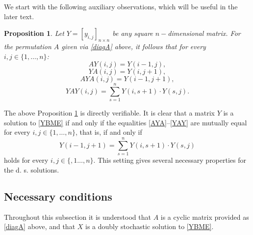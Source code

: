 \documentclass{article}
\newtheorem{proposition}{Proposition}[section]
\theoremstyle{definition}\newtheorem{example}{Example}[section]
\begin{document}
	We start with the following auxiliary observations, which will be useful in the later text. 
	
	
	\begin{proposition}\label{YAcirc}
		Let $Y=\left[y_{i,j}\right]_{n\times n}$ be any square $n-$dimensional matrix. For the permutation $A$ given via \eqref{diagA} above, it follows that for every $i,j\in\{1,\ldots,n\}$:
		\begin{equation}
			\label{AY} AY(i,j)=Y(i-1,j), \end{equation}
		\begin{equation}
			\label{YA}
			YA(i,j)=Y(i,j+1),
		\end{equation}
		\begin{equation}
			\label{AYA}
			AYA(i,j)=Y(i-1,j+1),
		\end{equation}
		\begin{equation}
			\label{YAY}
			YAY(i,j)=\sum_{s=1}^n Y(i,s+1)\cdot Y(s,j).
		\end{equation}
	\end{proposition}
	
	The above Proposition \ref{YAcirc} is directly verifiable. It is clear that a matrix $Y$ is a solution to \eqref{YBME} if and only if the equalities \eqref{AYA}--\eqref{YAY} are mutually equal for every $i,j\in\{1,\ldots,n\}$, that is, if and only if
	\begin{equation}
		\label{condtij}
		Y(i-1,j+1)=\sum_{s=1}^n Y(i,s+1)\cdot Y(s,j)
	\end{equation} 
	holds for every $i,j\in\{,1\ldots,n\}$. This setting gives several necessary properties for the d. s. solutions.
	\subsection{Necessary conditions}
	Throughout this subsection it is understood that $A$ is a cyclic matrix provided as \eqref{diagA} above, and that $X$ is a doubly stochastic solution to \eqref{YBME}. 
	
\end{document}
